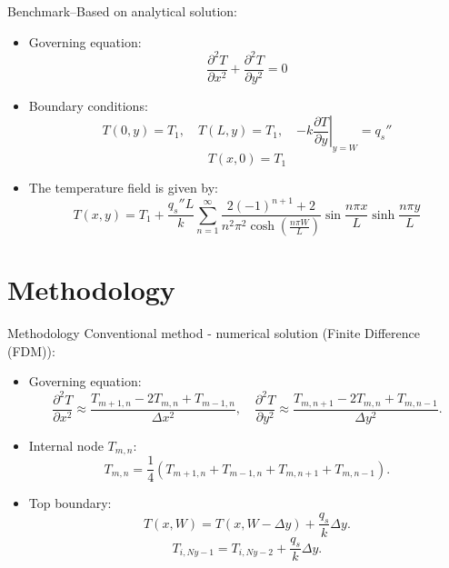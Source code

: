 \documentclass{beamer}
\begin{document}
\begin{frame}{Benchmark--Based on analytical solution:}
\begin{itemize}
    \item Governing equation:
            \begin{equation}
                \frac{\partial^2 T}{\partial x^2} + \frac{\partial^2 T}{\partial y^2} = 0
            \end{equation}
    \item Boundary conditions:
        \[
        T(0, y) = T_1, \quad T(L, y) = T_1, \quad \left. -k \frac{\partial T}{\partial y} \right|_{y=W} = q_s''
        \]
        \[
        T(x, 0) = T_1
        \]
    \item The temperature field is given by:
    \begin{equation}
    T(x,y) = T_1 + \frac{q_s'' L}{k} \sum_{n=1}^\infty \frac{2(-1)^{n+1}+2}{n^2\pi^2 \cosh \left( \frac{n\pi W}{L} \right) }\sin \frac{n\pi x}{L}\sinh\frac{n\pi y}{L}
    \end{equation}
\end{itemize}

\end{frame}


\section{Methodology}
\begin{frame}{Methodology}
Conventional method - numerical solution (Finite Difference (FDM)): 
    \begin{itemize} 
    \item Governing equation:
    \begin{equation}
    \frac{\partial^2 T}{\partial x^2} \approx \frac{T_{m+1,n} - 2T_{m,n} + T_{m-1,n}}{\Delta x^2}, \quad
    \frac{\partial^2 T}{\partial y^2} \approx \frac{T_{m,n+1} - 2T_{m,n} + T_{m,n-1}}{\Delta y^2}.
    \end{equation}
    \item Internal node \( T_{m,n} \):\[
T_{m,n} = \frac{1}{4} \left( T_{m+1,n} + T_{m-1,n} + T_{m,n+1} + T_{m,n-1} \right).
\]
    \item Top boundary:
            \[
            T(x, W) = T(x, W - \Delta y) + \frac{q_s}{k} \Delta y.
            \]
            \[
                T_{i, Ny-1} = T_{i, Ny-2} + \frac{q_s}{k} \Delta y.
            \]

    \end{itemize}
\end{frame}
\end{document}
